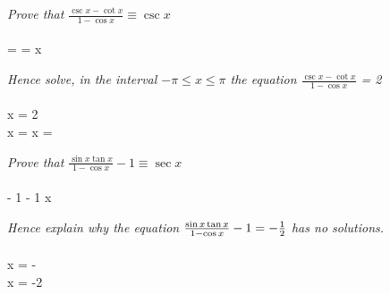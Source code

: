 \documentclass{../../main}
\begin{document}
	
	\question
	
	\begin{arr}[a]
		\textit{Prove that $\frac{\csc x - \cot x}{1 - \cos x} \equiv \csc x$} \\ \\

		 \equiv {} =  \equiv {} = \csc x
	\end{arr}

	\begin{arr}[b]
		\textit{Hence solve, in the interval $-\pi \leq x \leq \pi$ the equation $\frac{\csc x - \cot x}{1 - \cos x}$ = 2} \\ \\

		\csc x = 2 \\
		\therefore \sin x =  \quad \therefore x =  \pi \rad \\
	\end{arr}

	\newpage

	
	\question
	
	\begin{arr}[a]
		\textit{Prove that $\frac{\sin x \tan x}{1 - \cos x} - 1 \equiv \sec x$} \\ \\

		 - 1 \equiv {} - 1 \equiv {} \equiv {} \equiv {} \equiv \sec x
	\end{arr}

	\begin{arr}[b]
		\textit{Hence explain why the equation $\frac{\sin x \tan x}{1 - \cos x} - 1 = -\frac{1}{2}$ has no solutions.} \\ \\

		\sec x = - \\
		\Rightarrow \cos x = -2 \\
	\end{arr}
\end{document}
